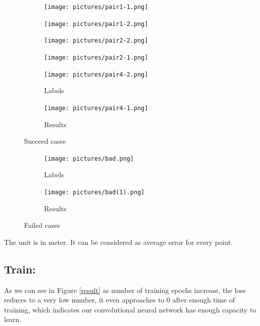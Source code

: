 \documentclass[10pt,twocolumn,letterpaper]{article}
\begin{document}
\begin{figure}
	\begin{subfigure}{.25\textwidth}
		\centering
		\texttt{[image: pictures/pair1-1.png]}
		\label{label1}
	\end{subfigure}%
	\begin{subfigure}{.25\textwidth}
		\centering
		\texttt{[image: pictures/pair1-2.png]}
		\label{result1}
	\end{subfigure}
	\begin{subfigure}{.25\textwidth}
		\centering
		\texttt{[image: pictures/pair2-2.png]}
		\label{label2}
	\end{subfigure}%
	\begin{subfigure}{.25\textwidth}
		\centering
		\texttt{[image: pictures/pair2-1.png]}
		\label{result2}
	\end{subfigure}
	\begin{subfigure}{.25\textwidth}
		\centering
		\texttt{[image: pictures/pair4-2.png]}
		\caption{Labels}
		\label{label3}
	\end{subfigure}%
	\begin{subfigure}{.25\textwidth}
		\centering
		\texttt{[image: pictures/pair4-1.png]}
		\caption{Results}
		\label{result3}
	\end{subfigure}
	\caption{Succeed cases}
	\label{good results}
\end{figure}

\begin{figure}
\begin{subfigure}{.25\textwidth}
	\centering
	\texttt{[image: pictures/bad.png]}
	\caption{Labels}
	\label{label4}
\end{subfigure}%
\begin{subfigure}{.25\textwidth}
	\centering
	\texttt{[image: pictures/bad(1).png]}
	\caption{Results}
	\label{result4}
\end{subfigure}
	\caption{Failed cases}
	\label{bad results}
\end{figure}



The unit is in meter. It can be considered as average error for every point. 
\subsection{Train:}
As we can see in Figure \ref{result} as number of training epochs increase, the loss reduces to a very low number, it even approaches to 0 after enough time of training, which indicates our convolutional neural network has enough capacity to learn.
\end{document}
